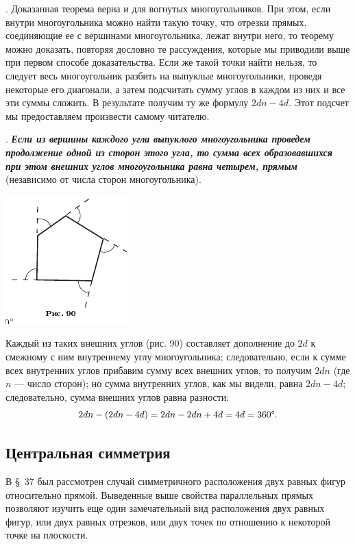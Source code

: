 \documentclass[oneside]{book}
\begin{document}
.
Доказанная теорема верна и для вогнутых многоугольников.
При этом, если внутри многоугольника можно найти такую точку, что отрезки прямых, соединяющие ее с вершинами многоугольника, лежат внутри него, то теорему можно доказать, повторяя дословно те рассуждения, которые мы приводили выше при первом способе доказательства.
Если же такой точки найти нельзя, то следует весь многоугольник разбить на выпуклые многоугольники, проведя некоторые его диагонали, а затем подсчитать сумму углов в каждом из них и все эти суммы сложить.
В результате получим ту же формулу $2dn - 4d$.
Этот подсчет мы предоставляем произвести самому читателю.

.
\textbf{\emph{Если из вершины каждого угла выпуклого многоугольника проведем продолжение одной из сторон этого угла, то сумма всех образовавшихся при этом внешних углов многоугольника равна четырем, прямым}} (независимо от числа сторон многоугольника).

\includegraphics{pics/ris-90}

Каждый из таких внешних углов (рис. 90) составляет дополнение до $2d$ к смежному с ним внутреннему углу многоугольника;
следовательно, если к сумме всех внутренних углов прибавим сумму всех внешних углов, то получим $2dn$ (где $n$ — число сторон);
но сумма внутренних углов, как мы видели, равна $2dn -4d$;
следовательно, сумма внешних углов равна разности:
\[2dn-(2dn-4d)=2dn-2dn+4d=4d=360\degree.\]

\subsection*{Центральная симметрия}

В §~37 был рассмотрен случай симметричного расположения двух равных фигур относительно прямой.
Выведенные выше свойства параллельных прямых позволяют изучить еще один замечательный вид расположения двух равных фигур, или двух равных отрезков, или двух точек по отношению к некоторой точке на плоскости.
\end{document}
